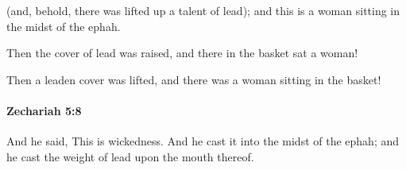 			\begin{versebox}
					\item[BHS] 
					\item[LXX] 
					\item[ASV] (and, behold, there was lifted up a talent of lead); and this is a woman sitting in the midst of the ephah.
					\item[NIV] Then the cover of lead was raised, and there in the basket sat a woman!
					\item[NRSV] Then a leaden cover was lifted, and there was a woman sitting in the basket!
			\end{versebox}

		\paragraph{Zechariah 5:8} %
			\label{ZECHARIAH-5-8}

			And he said, This is wickedness. And he cast it into the midst of the ephah; and he cast the weight of lead upon the mouth thereof.

